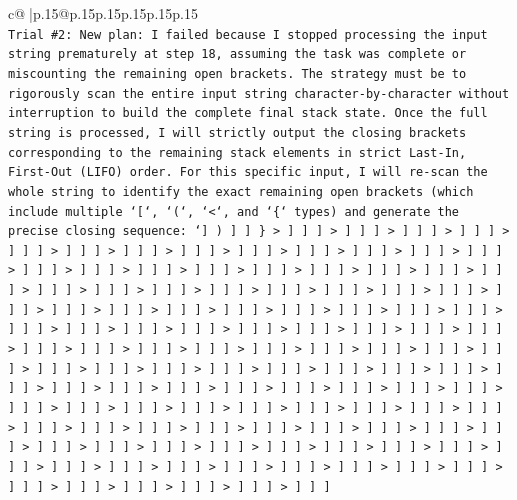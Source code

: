 \documentclass{article}
\begin{document}
{\begin{supertabular}{c@{$\;$}|p{.15\linewidth}@{}p{.15\linewidth}p{.15\linewidth}p{.15\linewidth}p{.15\linewidth}p{.15\linewidth}}
{{{\\ 
\texttt{Trial \#2: New plan: I failed because I stopped processing the input string prematurely at step 18, assuming the task was complete or miscounting the remaining open brackets. The strategy must be to rigorously scan the entire input string character{-}by{-}character without interruption to build the complete final stack state. Once the full string is processed, I will strictly output the closing brackets corresponding to the remaining stack elements in strict Last{-}In, First{-}Out (LIFO) order. For this specific input, I will re{-}scan the whole string to identify the exact remaining open brackets (which include multiple `{[}`, `(`, `<`, and `\{` types) and generate the precise closing sequence: `{]} ) {]} {]} \} > {]} {]} {]} > {]} {]} {]} > {]} {]} {]} > {]} {]} {]} > {]} {]} {]} > {]} {]} {]} > {]} {]} {]} > {]} {]} {]} > {]} {]} {]} > {]} {]} {]} > {]} {]} {]} > {]} {]} {]} > {]} {]} {]} > {]} {]} {]} > {]} {]} {]} > {]} {]} {]} > {]} {]} {]} > {]} {]} {]} > {]} {]} {]} > {]} {]} {]} > {]} {]} {]} > {]} {]} {]} > {]} {]} {]} > {]} {]} {]} > {]} {]} {]} > {]} {]} {]} > {]} {]} {]} > {]} {]} {]} > {]} {]} {]} > {]} {]} {]} > {]} {]} {]} > {]} {]} {]} > {]} {]} {]} > {]} {]} {]} > {]} {]} {]} > {]} {]} {]} > {]} {]} {]} > {]} {]} {]} > {]} {]} {]} > {]} {]} {]} > {]} {]} {]} > {]} {]} {]} > {]} {]} {]} > {]} {]} {]} > {]} {]} {]} > {]} {]} {]} > {]} {]} {]} > {]} {]} {]} > {]} {]} {]} > {]} {]} {]} > {]} {]} {]} > {]} {]} {]} > {]} {]} {]} > {]} {]} {]} > {]} {]} {]} > {]} {]} {]} > {]} {]} {]} > {]} {]} {]} > {]} {]} {]} > {]} {]} {]} > {]} {]} {]} > {]} {]} {]} > {]} {]} {]} > {]} {]} {]} > {]} {]} {]} > {]} {]} {]} > {]} {]} {]} > {]} {]} {]} > {]} {]} {]} > {]} {]} {]} > {]} {]} {]} > {]} {]} {]} > {]} {]} {]} > {]} {]} {]} > {]} {]} {]} > {]} {]} {]} > {]} {]} {]} > {]} {]} {]} > {]} {]} {]} > {]} {]} {]} > {]} {]} {]} > {]} {]} {]} > {]} {]} {]} > {]} {]} {]} > {]} {]} {]} > {]} {]} {]} > {]} {]} {]} > {]} {]} {]} > {]} {]} {]} > {]} {]} {]} > {]} {]} {]} > {]} {]} {]} > {]} {]} {]} > {]} {]} {]} > {]} {]} {]} > {]} {]} {]} > {]} {]} {]} > {]} {]} {]} > {]} {]} {]} > {]} {]} {]} > {]} {]} {]} > {]} {]} {]} > {]} {]} {]} > {]} {]} {]} > {]} {]} {]} > {]} {]} {]} > {]} {]} {]} > {]} {]} {]} > {]} {]} {]} > {]} {]} {]} > {]} {]} {]} > {]} {]} {]} > {]} {]} {]} > {]} {]} {]} > {]} {]} {]}} \\
\\ 
}}}
\end{supertabular}}
\end{document}
